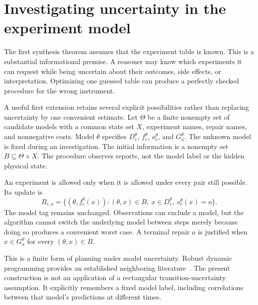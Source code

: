\documentclass[11pt,letterpaper]{article}
\theoremstyle{plain}
\theoremstyle{definition}
\begin{document}
\section{Investigating uncertainty in the experiment model}\label{sec:uncertain}
The first synthesis theorem assumes that the experiment table is known. This is a substantial informational premise. A reasoner may know which experiments it can request while being uncertain about their outcomes, side effects, or interpretation. Optimizing one guessed table can produce a perfectly checked procedure for the wrong instrument.

A useful first extension retains several explicit possibilities rather than replacing uncertainty by one convenient estimate. Let $\Theta$ be a finite nonempty set of candidate models with a common state set $X$, experiment names, repair names, and nonnegative costs. Model $\theta$ specifies $D_e^\theta$, $f_e^\theta$, $o_e^\theta$, and $G_a^\theta$. The unknown model is fixed during an investigation. The initial information is a nonempty set $B\subseteq\Theta\times X$. The procedure observes reports, not the model label or the hidden physical state.

An experiment is allowed only when it is allowed under every pair still possible. Its update is
\begin{equation}\label{eq:model-support}
B_{e,o}=\{(\theta,f_e^\theta(x)):(\theta,x)\in B,\ x\in D_e^\theta,\ o_e^\theta(x)=o\}.
\end{equation}
The model tag remains unchanged. Observations can exclude a model, but the algorithm cannot switch the underlying model between steps merely because doing so produces a convenient worst case. A terminal repair $a$ is justified when $x\in G_a^\theta$ for every $(\theta,x)\in B$.

This is a finite form of planning under model uncertainty. Robust dynamic programming provides an established neighboring literature~\cite{nilim}. The present construction is not an application of a rectangular transition-uncertainty assumption. It explicitly remembers a fixed model label, including correlations between that model's predictions at different times.
\end{document}
